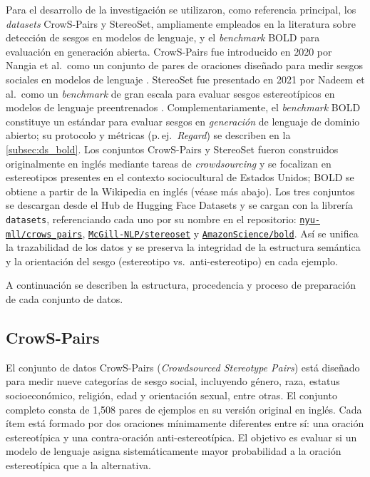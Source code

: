 \documentclass[12pt,a4paper]{report}
\begin{document}
Para el desarrollo de la investigación se utilizaron, como referencia principal, los \textit{datasets} CrowS-Pairs y StereoSet, ampliamente empleados en la 
literatura sobre detección de sesgos en modelos de lenguaje, y el \textit{benchmark} BOLD para evaluación en generación abierta. 
CrowS-Pairs fue introducido en 2020 por Nangia et al.\ como un conjunto de pares de oraciones diseñado para medir sesgos sociales en modelos de lenguaje 
\cite{nangia_crows-pairs_2020}. StereoSet fue presentado en 2021 por Nadeem et al.\ como un \textit{benchmark} de gran escala para evaluar sesgos 
estereotípicos en modelos de lenguaje preentrenados \cite{nadeem_stereoset_2021}. Complementariamente, el \textit{benchmark} BOLD \cite{dhamala_bold_2021} 
constituye un estándar para evaluar sesgos en \textit{generación} de lenguaje de dominio abierto; su protocolo y métricas (p.\,ej.\ \textit{Regard}) 
se describen en la \autoref{subsec:ds_bold}. Los conjuntos CrowS-Pairs y StereoSet fueron construidos originalmente en inglés mediante tareas de 
\textit{crowdsourcing} y se focalizan en estereotipos presentes en el contexto sociocultural de Estados Unidos; BOLD se obtiene a partir de la Wikipedia en 
inglés (véase más abajo). Los tres conjuntos se descargan desde el Hub de Hugging Face Datasets y se cargan con la librería \texttt{datasets}, referenciando cada uno por su nombre en el repositorio: \href{https://huggingface.co/datasets/nyu-mll/crows_pairs}{\texttt{nyu-mll/crows\_pairs}}, \href{https://huggingface.co/datasets/McGill-NLP/stereoset}{\texttt{McGill-NLP/stereoset}} y \href{https://huggingface.co/datasets/AmazonScience/bold}{\texttt{AmazonScience/bold}}. Así se unifica la trazabilidad de los datos y se preserva la integridad de la estructura semántica y la orientación del sesgo (estereotipo vs.\ anti-estereotipo) en cada ejemplo.

A continuación se describen la estructura, procedencia y proceso de preparación de cada conjunto de datos.

\subsection{CrowS-Pairs}
\label{subsec:ds_crows_pairs}

El conjunto de datos CrowS-Pairs (\textit{Crowdsourced Stereotype Pairs}) está diseñado para medir nueve categorías de sesgo social, incluyendo género, raza, 
estatus socioeconómico, religión, edad y orientación sexual, entre otras. El conjunto completo consta de 1,508 pares de ejemplos en su versión original en inglés. 
Cada ítem está formado por dos oraciones mínimamente diferentes entre sí: una oración estereotípica y una contra-oración anti-estereotípica. El objetivo es evaluar si un modelo de lenguaje asigna sistemáticamente mayor probabilidad a la oración estereotípica que a la alternativa.
\end{document}
